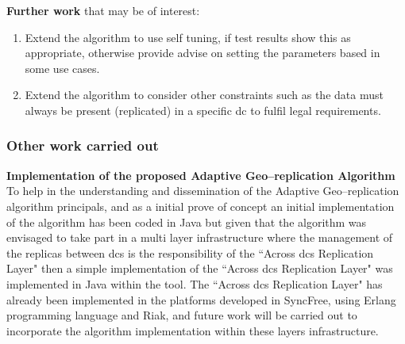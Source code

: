 \documentclass[12pt,twoside]{article}
\begin{document}
{\bf Further work} that may be of interest:
\begin{enumerate}
	\item Extend the algorithm to use self tuning, if test results show this as appropriate, otherwise provide advise on setting the parameters based in some use cases.

	\item Extend the algorithm to consider other constraints such as the data must always be present (replicated) in a specific \gls{dc} to fulfil legal requirements.
\end{enumerate}


\subsubsection{Other work carried out}
{\bf Implementation of the proposed Adaptive Geo--replication Algorithm}\\
To help in the understanding and dissemination of the Adaptive Geo--replication algorithm principals, and as a initial prove of concept an initial implementation of the algorithm has been coded in Java but given that the algorithm was envisaged to take part in a multi layer infrastructure where the management of the replicas between \glspl{dc} is the responsibility of the ``Across \glspl{dc} Replication Layer" then a simple implementation of the ``Across \glspl{dc} Replication Layer" was implemented in Java within the tool. The ``Across \glspl{dc} Replication Layer" has already been implemented in the platforms developed in SyncFree, using Erlang programming language and Riak, and future work will be carried out to incorporate the algorithm implementation within these layers infrastructure.
\end{document}
